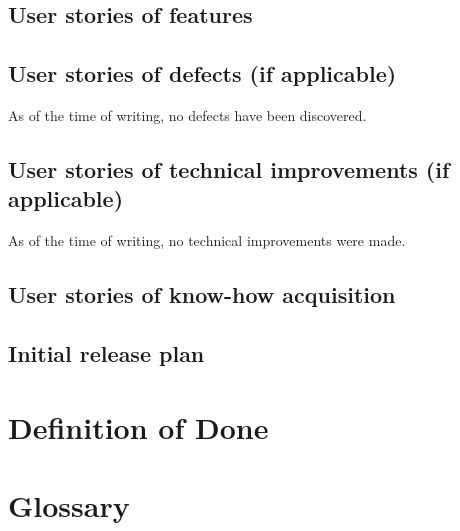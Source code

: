 \section{User stories of features}

\section{User stories of defects (if applicable)}
As of the time of writing, no defects have been discovered.

\section{User stories of technical improvements (if applicable)}
As of the time of writing, no technical improvements were made.

\section{User stories of know-how acquisition}

\section{Initial release plan}


\chapter{Definition of Done}


\chapter{Glossary}